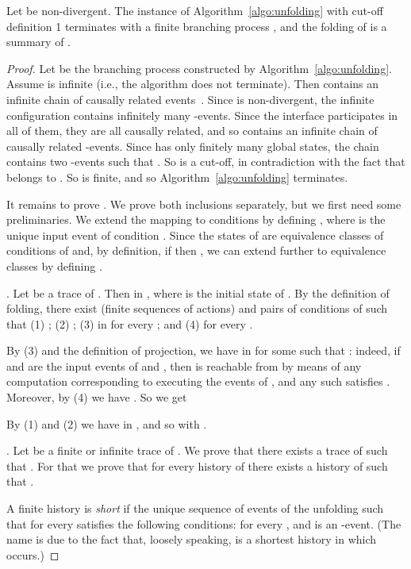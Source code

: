 \documentclass{llncs}
\begin{document}
\begin{theorem}
\label{th:interfacefair}
Let  be non-divergent. The instance of Algorithm~\ref{algo:unfolding} with cut-off definition 1 terminates with a finite branching process , and the folding  of  is a summary of .
\end{theorem}

\begin{proof}
Let  be the branching process constructed by Algorithm~\ref{algo:unfolding}.
Assume  is infinite (i.e., the algorithm does not terminate). 
Then  contains an infinite chain  of causally related events~\cite{Khomenko03}. 
Since  is non-divergent, the infinite configuration  contains infinitely
many -events. Since the interface  participates in all of them, they are all causally related, 
and so  contains an infinite chain  of causally related -events. Since
 has only finitely many global states, the chain contains two -events  such that
. So  is a cut-off, in contradiction with the fact that  belongs to . 
So  is finite, and so Algorithm~\ref{algo:unfolding} terminates.

\vspace{0.2cm}
It remains to prove . We prove both inclusions separately,
but we first need some preliminaries. We extend the mapping  to conditions
by defining , where  is the unique input event of condition . Since the states of  
are equivalence classes of conditions of  and, by definition, if  
then , we can extend  further to equivalence classes by defining
. 

. Let  be a trace of . Then  in ,
where  is the initial state of .
By the definition of folding, there exist  (finite sequences of actions) and pairs  of conditions of  such that
(1) ; (2) ; (3)  in  for every ; 
and (4)  for every . 

By (3) and the definition of projection, we have
 in  for some  such that : indeed, if  and  are the input events of  and , then  is reachable from  by means of any computation  corresponding to executing the events of , and any
such  satisfies . Moreover, by (4) we have . So we get 

\noindent By (1) and (2) we have  in , and so
 with .

.  Let  be a finite or infinite trace of .
We prove that there exists a trace  of  such that .
For that we prove that for every history  of  there exists a history  of  
such that . 

A finite history  is {\em short} if the unique sequence of events of the unfolding
 such that  for every  satisfies the
following conditions:  for every , and  is an -event.
(The name is due to the fact that, loosely speaking,  is a shortest history in which  occurs.)  


\end{proof}
\end{document}
